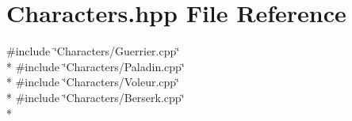 \section{Characters.\-hpp File Reference}
\label{_characters_8hpp}
{\ttfamily \#include \char`\"{}Characters/\-Guerrier.\-cpp\char`\"{}}\\*
{\ttfamily \#include \char`\"{}Characters/\-Paladin.\-cpp\char`\"{}}\\*
{\ttfamily \#include \char`\"{}Characters/\-Voleur.\-cpp\char`\"{}}\\*
{\ttfamily \#include \char`\"{}Characters/\-Berserk.\-cpp\char`\"{}}\\*

